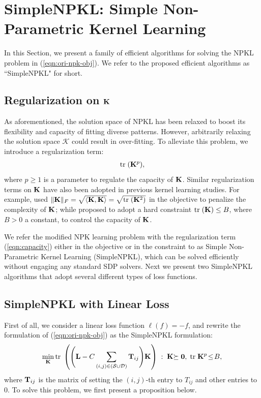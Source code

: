 \section{SimpleNPKL: Simple Non-Parametric Kernel Learning}
\label{sec:simpleNPKL}

In this Section, we present a family of efficient algorithms for solving the NPKL
problem in (\ref{eqn:ori-npk-obj}). We refer to the proposed efficient algorithms as
``SimpleNPKL" for short.

\subsection{Regularization on ${\bf K}$}

As aforementioned, the solution space of NPKL has been relaxed to boost its flexibility and capacity of fitting diverse patterns. However, arbitrarily relaxing the solution space $\mathcal K$ could result in  over-fitting. To alleviate this problem, we introduce a regularization term:
\begin{eqnarray}
\tr(\K^p), \label{eqn:capacity}
\end{eqnarray}
where $p\geq 1$ is a parameter to regulate the capacity of ${\bf K}$. Similar
regularization terms on ${\bf K}$ have also been  adopted in previous kernel learning
studies. For example, \cite{nips/CristianiniSEK01} used $\|{\bf K}\|_F=\sqrt{\langle {\bf K},
{\bf K} \rangle}=\sqrt{{\mbox{tr}\;}({\bf K}^2)}$ in the objective to penalize the complexity of ${\bf K}$;
while \cite{jmlr/LanckrietCBGJ03} proposed to adopt a hard constraint ${\mbox{tr}\;}({\bf K})\leq
B$, where $B>0$ a constant, to control the capacity of ${\bf K}$.


We refer  the modified NPK learning problem with the regularization term
(\ref{eqn:capacity}) either in the objective or in the constraint to as Simple
Non-Parametric Kernel Learning (SimpleNPKL), which can be solved efficiently
without engaging any standard SDP solvers. Next we present two SimpleNPKL
algorithms that adopt several different types of loss functions.

\subsection{SimpleNPKL with Linear Loss}

First of all, we consider a linear loss function $\ell(f)=-f$, and rewrite the formulation of
(\ref{eqn:ori-npk-obj}) as the SimpleNPKL formulation:
\begin{eqnarray}
\min_{\K} \tr\left(\Bigg(\L - C\sum_{(i,j) \in (\SS\cup\DD)}
\T_{ij}\Bigg)\K\right)\;:\;\K\psd,\; \tr\K^p \!\leq\!B,
\label{eqn:npk-lin}
\end{eqnarray}
where  ${\bf T}_{ij}$ is the matrix of setting the $(i,j)$-th entry to $T_{ij}$ and other
entries to 0. To solve this problem, we first present a proposition below.


